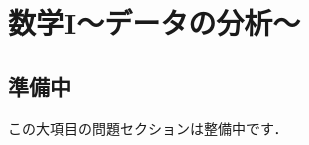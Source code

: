 \documentclass[../../ms_q.tex]{subfiles}
\begin{document}
\section{数学I～データの分析～}

\subsection*{準備中}
この大項目の問題セクションは整備中です．
\end{document}
